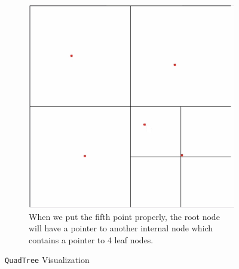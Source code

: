 \begin{center}
\begin{figure}[H]
\begin{subfigure}[t]{0.38\textwidth}
        \includegraphics[width=\linewidth]{images/task4_quad5.png}
        \caption{When we put the fifth point properly, the root node will have a pointer to another internal node which contains a pointer to 4 leaf nodes. }
        \label{fig:subfig5}
    \end{subfigure}

    \caption{\texttt{QuadTree} Visualization}
\end{figure}



\end{center}
